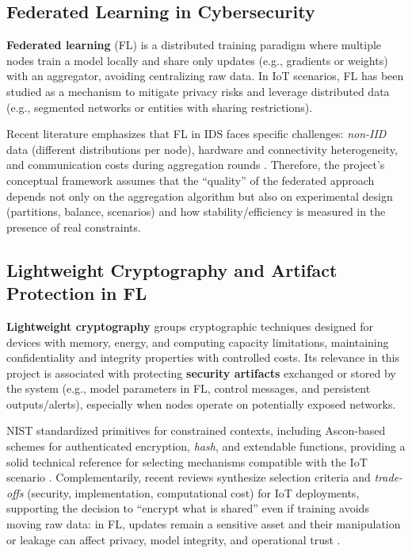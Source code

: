 \subsection{Federated Learning in Cybersecurity}
\textbf{Federated learning} (FL) is a distributed training paradigm where multiple nodes train a model locally and share only updates (e.g., gradients or weights) with an aggregator, avoiding centralizing raw data. In IoT scenarios, FL has been studied as a mechanism to mitigate privacy risks and leverage distributed data (e.g., segmented networks or entities with sharing restrictions).

\newline
\newline
Recent literature emphasizes that FL in IDS faces specific challenges: \textit{non-IID} data (different distributions per node), hardware and connectivity heterogeneity, and communication costs during aggregation rounds \cite{Alsghaier2025,Albanbay2025}. Therefore, the project's conceptual framework assumes that the ``quality'' of the federated approach depends not only on the aggregation algorithm but also on experimental design (partitions, balance, scenarios) and how stability/efficiency is measured in the presence of real constraints.

\subsection{Lightweight Cryptography and Artifact Protection in FL}
\textbf{Lightweight cryptography} groups cryptographic techniques designed for devices with memory, energy, and computing capacity limitations, maintaining confidentiality and integrity properties with controlled costs. Its relevance in this project is associated with protecting \textbf{security artifacts} exchanged or stored by the system (e.g., model parameters in FL, control messages, and persistent outputs/alerts), especially when nodes operate on potentially exposed networks.

\newline
\newline
NIST standardized primitives for constrained contexts, including Ascon-based schemes for authenticated encryption, \textit{hash}, and extendable functions, providing a solid technical reference for selecting mechanisms compatible with the IoT scenario \cite{NISTSP8002322025}. Complementarily, recent reviews synthesize selection criteria and \textit{trade-offs} (security, implementation, computational cost) for IoT deployments, supporting the decision to ``encrypt what is shared'' even if training avoids moving raw data: in FL, updates remain a sensitive asset and their manipulation or leakage can affect privacy, model integrity, and operational trust \cite{Gusita2025}.

